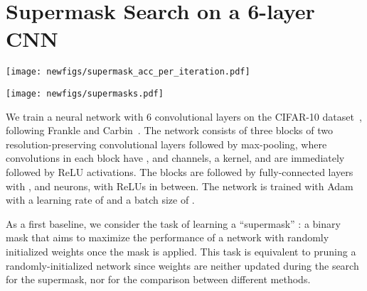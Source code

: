 \documentclass{article}
\newcommand{\citep}[1]{\cite{#1}}
\newcommand{\citet}[1]{\cite{#1}}
\newcommand{\method}{Continuous Sparsification}
\newcommand{\methodacro}{CS}
\begin{document}
\section{Supermask Search on a 6-layer CNN}
\label{app:supermask}

\begin{figure*}[!t]
    \centering
    \begin{minipage}[l]{0.49\linewidth}
      \centering
      \texttt{[image: newfigs/supermask\_acc\_per\_iteration.pdf]}
    \end{minipage}
    \hfill
    \begin{minipage}[l]{0.49\linewidth}
      \centering
      \texttt{[image: newfigs/supermasks.pdf]}
    \end{minipage}
    \caption{Learning a binary mask with weights frozen at initialization with Stochastic Sparsification (SS, Algorithm \ref{alg:isp} with one iteration) and \method~(\methodacro), on a 6-layer CNN on CIFAR-10. \textbf{Left:} Training curves with hyperparameters for which masks learned by SS and \methodacro~ were both approximately  sparse. \methodacro~ learns the mask significantly faster while attaining similar early-stop performance. \textbf{Right:} Sparsity and test accuracy of masks learned with different settings for SS and {\methodacro}: our method learns sparser masks while maintaining test performance, while SS is unable to successfully learn masks with over  sparsity.}
    \label{fig:supermaskconv6}
\end{figure*}

We train a neural network with 6 convolutional layers on the CIFAR-10 dataset~\citep{cifar}, following Frankle and Carbin~\citet{lth}. The network consists of three blocks of two resolution-preserving convolutional layers followed by  max-pooling, where convolutions in each block have , and  channels, a  kernel, and are immediately followed by ReLU activations. The blocks are followed by fully-connected layers with , and  neurons, with ReLUs in between. The network is trained with Adam~\citep{adam} with a learning rate of  and a batch size of .

As a first baseline, we consider the task of learning a ``supermask'' \citep{deconstructing}: a binary mask  that aims to maximize the performance of a network with randomly initialized weights once the mask is applied. This task is equivalent to pruning a randomly-initialized network since weights are neither updated during the search for the supermask, nor for the comparison between different methods.
\end{document}
